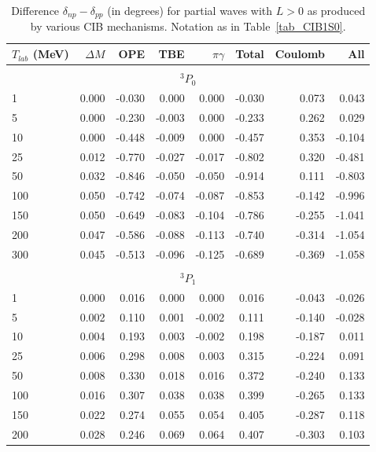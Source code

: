 \begin{table}
\caption{
Difference 
$\delta_{np} - \delta_{pp}$ 
(in degrees) for partial waves with $L>0$
as produced by various CIB mechanisms. 
Notation as in Table~\ref{tab_CIB1S0}.}
\begin{tabular}{lrrrrrrr}
 $T_{lab}$ (MeV)
 & $\Delta M$
 & OPE
 & TBE 
 & $\pi\gamma$
 & Total 
 & Coulomb
 & All
\\
 \hline 
\hline                                                                          
\\ \multicolumn{8}{c}{$^3P_0$} \\                                               
    1 & 0.000 &-0.030 & 0.000 & 0.000 &-0.030 & 0.073 & 0.043 \\
    5 & 0.000 &-0.230 &-0.003 & 0.000 &-0.233 & 0.262 & 0.029 \\
   10 & 0.000 &-0.448 &-0.009 & 0.000 &-0.457 & 0.353 &-0.104 \\
   25 & 0.012 &-0.770 &-0.027 &-0.017 &-0.802 & 0.320 &-0.481 \\
   50 & 0.032 &-0.846 &-0.050 &-0.050 &-0.914 & 0.111 &-0.803 \\
  100 & 0.050 &-0.742 &-0.074 &-0.087 &-0.853 &-0.142 &-0.996 \\
  150 & 0.050 &-0.649 &-0.083 &-0.104 &-0.786 &-0.255 &-1.041 \\
  200 & 0.047 &-0.586 &-0.088 &-0.113 &-0.740 &-0.314 &-1.054 \\
  300 & 0.045 &-0.513 &-0.096 &-0.125 &-0.689 &-0.369 &-1.058 \\
\hline                                                                          
\\ \multicolumn{8}{c}{$^3P_1$} \\                                               
    1 & 0.000 & 0.016 & 0.000 & 0.000 & 0.016 &-0.043 &-0.026 \\
    5 & 0.002 & 0.110 & 0.001 &-0.002 & 0.111 &-0.140 &-0.028 \\
   10 & 0.004 & 0.193 & 0.003 &-0.002 & 0.198 &-0.187 & 0.011 \\
   25 & 0.006 & 0.298 & 0.008 & 0.003 & 0.315 &-0.224 & 0.091 \\
   50 & 0.008 & 0.330 & 0.018 & 0.016 & 0.372 &-0.240 & 0.133 \\
  100 & 0.016 & 0.307 & 0.038 & 0.038 & 0.399 &-0.265 & 0.133 \\
  150 & 0.022 & 0.274 & 0.055 & 0.054 & 0.405 &-0.287 & 0.118 \\
  200 & 0.028 & 0.246 & 0.069 & 0.064 & 0.407 &-0.303 & 0.103 \\

\end{tabular}
\end{table}
